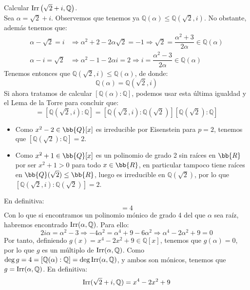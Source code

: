 \begin{ejercicio}
    Calcular $\operatorname{Irr}\left(\sqrt{2}+i,\mathbb{Q}\right)$.\\ 

    \noindent
    Sea $\alpha = \sqrt{2}+i$. Observemos que tenemos ya $\mathbb{Q}(\alpha)\leq \mathbb{Q}(\sqrt{2},i)$. No obstante, además tenemos que:
    \begin{align*}
        \alpha-\sqrt{2} = i &\Longrightarrow \alpha^2+2-2\alpha\sqrt{2} = -1 \Longrightarrow \sqrt{2} = \dfrac{\alpha^2+3}{2\alpha} \in \mathbb{Q}(\alpha) \\
        \alpha-i = \sqrt{2} &\Longrightarrow \alpha^2-1-2\alpha i = 2 \Longrightarrow i = \dfrac{\alpha^2-3}{2\alpha}\in \mathbb{Q}(\alpha)
    \end{align*}
    Tenemos entonces que $\mathbb{Q}(\sqrt{2},i)\leq \mathbb{Q}(\alpha)$, de donde:
    \begin{equation*}
        \mathbb{Q}(\alpha) = \mathbb{Q}(\sqrt{2},i)
    \end{equation*}
    Si ahora tratamos de calcular $[\mathbb{Q}(\alpha):\mathbb{Q}]$, podemos usar esta última igualdad y el Lema de la Torre para concluir que:
    \begin{equation*}
        [\mathbb{Q}(\alpha):\mathbb{Q}] = [\mathbb{Q}(\sqrt{2},i):\mathbb{Q}] = [\mathbb{Q}(\sqrt{2},i):\mathbb{Q}(\sqrt{2})][\mathbb{Q}(\sqrt{2}):\mathbb{Q}]
    \end{equation*}
    \begin{itemize}
        \item Como $x^2-2\in \bb{Q}[x]$ es irreducible por Eisenstein para $p=2$, tenemos que $[\mathbb{Q}(\sqrt{2}):\mathbb{Q}]=2$.
        \item Como $x^2+1\in \bb{Q}[x]$ es un polinomio de grado 2 sin raíces en $\bb{R}$ por ser $x^2+1>0$ para todo $x\in \bb{R}$, en particular tampoco tiene raíces en $\bb{Q}(\sqrt{2})\leq \bb{R}$, luego es irreducible en $\mathbb{Q}(\sqrt{2})$, por lo que $[\mathbb{Q}(\sqrt{2},i):\mathbb{Q}(\sqrt{2})]=2$.
    \end{itemize}
    En definitiva:
    \begin{equation*}
        [\mathbb{Q}(\alpha):\mathbb{Q}] = 4
    \end{equation*}
    Con lo que si encontramos un polinomio mónico de grado 4 del que $\alpha$ sea raíz, habremos encontrado $\operatorname{Irr}(\alpha,\mathbb{Q})$. Para ello:
    \begin{equation*}
        2i\alpha = \alpha^2 -3 \Longrightarrow -4\alpha^2 = \alpha^4 + 9 - 6\alpha^2 \Longrightarrow \alpha^4 -2\alpha^2+9 = 0
    \end{equation*}
    Por tanto, definiendo $g(x)= x^4-2x^2+9\in \mathbb{Q}[x]$, tenemos que $g(\alpha)=0$, por lo que $g$ es un múltiplo de $\operatorname{Irr}(\alpha,\mathbb{Q})$. Como $\deg g = 4 = [\mathbb{Q}(\alpha):\mathbb{Q}]= \deg \operatorname{Irr}(\alpha,\mathbb{Q})$, y ambos son mónicos, tenemos que $g = \operatorname{Irr}(\alpha,\mathbb{Q})$. En definitiva:
    \begin{equation*}
        \operatorname{Irr}(\sqrt{2}+i,\mathbb{Q}) = x^4-2x^2+9
    \end{equation*}
\end{ejercicio}

